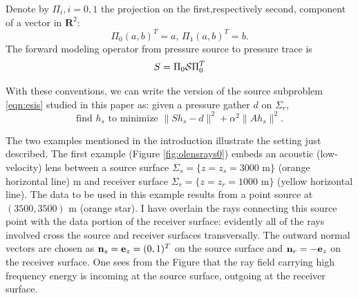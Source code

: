 \documentclass[12pt]{geophysics}
\newcommand{\bR}{\mathbf{R}}
\begin{document}
Denote by $\Pi_i, i=0,1$ the projection on the first,respectively
second, component of a vector in $\bR^2$:
\begin{equation}
  \label{eqn:pidef}
  \Pi_0 (a,b)^T = a, \, \Pi_1(a,b)^T= b.
\end{equation}
The forward modeling
operator from pressure source to pressure trace is
\begin{equation}
  \label{eqn:sdef}
  S = \Pi_0 {\cal S}\Pi_0^T 
\end{equation}

With these conventions, we can write the version of the source
subproblem \ref{eqn:esis} studied in this paper as: given a pressure
gather $d$ on $\Sigma_r$,
\begin{equation}
  \label{eqn:esisp}
  \mbox{find }h_s\mbox{ to minimize }\|Sh_s- d\|^2 +
  \alpha^2\|Ah_s\|^2.
\end{equation}

The two examples mentioned in the introduction illustrate the setting
just described. The first example (Figure \ref{fig:olensrays0}) embeds
an acoustic (low-velocity) lens between a source surface
$\Sigma_s= \{z = z_s=3000 \mbox{ m}\}$ (orange horizontal line) m and
receiver surface $\Sigma_r= \{z=z_r=1000 \mbox{ m}\}$ (yellow
horizontal line).  The data to be used in this example results from a
point source at $(3500, 3500)$ m (orange star). I have overlain
the rays connecting this source point with the data portion of the
receiver surface: evidently all of the rays involved cross the source
and receiver surfaces transversally. The outward normal vectors are chosen as
${\bf n}_s={\bf e}_z=(0,1)^T$ on the source surface and ${\bf
  n}_r=-{\bf e}_z$ on the receiver surface.
One sees from the Figure that the ray field carrying high frequency
energy is incoming at the source surface,
outgoing at the receiver surface.
\end{document}

